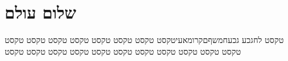 \documentclass[twoside, openany, parskip=half, 11pt]{book}
\begin{document}
    \chapter{שלום עולם}

     טקסט לחגכע גכעחמשףםקרומאעיטקסט טקסט טקסט טקסט טקסט טקסט טקסט טקסט טקסט טקסט טקסט טקסט טקסט טקסט טקסט טקסט טקסט טקסט טקסט
\end{document}

